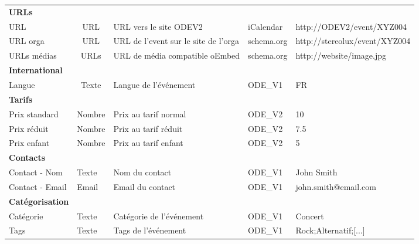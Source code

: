 \begin{table}[h]
\begin{adjustwidth}{-1.8cm}{}
\begin{tabular}{lclll}
{\bf URLs} &  &  &  &  \\

URL & URL & URL vers le site ODEV2 & iCalendar & http://ODEV2/event/XYZ004 \\
URL orga & URL & URL de l'event sur le site de l'orga & schema.org & http://stereolux/event/XYZ004 \\
URLs médias & URLs & URL de média compatible oEmbed & schema.org & http://website/image.jpg \\
{\bf International} &  &  &  &  \\

Langue & Texte & Langue de l'événement & ODE\_V1 & FR \\

{\bf Tarifs} &  &  &  &  \\

Prix standard & Nombre & Prix au tarif normal & ODE\_V2 & 10 \\
Prix réduit & Nombre & Prix au tarif réduit & ODE\_V2 & 7.5 \\
Prix enfant & \multicolumn{1}{l}{Nombre} & Prix au tarif enfant & ODE\_V2 & 5 \\

{\bf Contacts} & \multicolumn{1}{l}{} &  &  &  \\

Contact - Nom & \multicolumn{1}{l}{Texte} & Nom du contact & ODE\_V1 & John Smith \\
Contact - Email & \multicolumn{1}{l}{Email} & Email du contact & ODE\_V1 & john.smith@email.com \\

{\bf Catégorisation} & \multicolumn{1}{l}{} &  &  &  \\

Catégorie & \multicolumn{1}{l}{Texte} & Catégorie de l'événement & ODE\_V1 & Concert \\
Tags & \multicolumn{1}{l}{Texte} & Tags de l'événement & ODE\_V1 & Rock;Alternatif;{[}...{]}
\end{tabular}
\end{adjustwidth}
\end{table}
